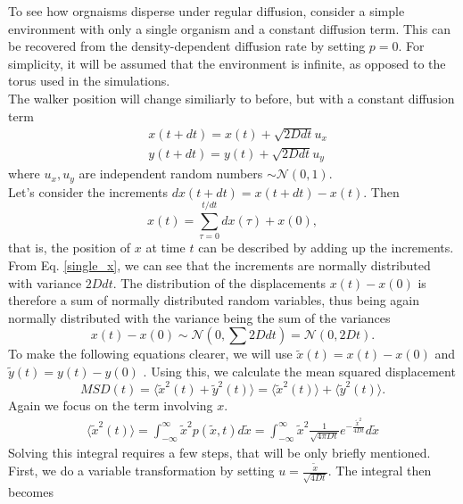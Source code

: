 \documentclass{article}
\begin{document}
To see how orgnaisms disperse under regular diffusion, consider a simple environment with only a single organism and a constant diffusion term. 
This can be recovered from the density-dependent diffusion rate by setting $p=0$.
For simplicity, it will be assumed that the environment is infinite, as opposed to the torus used in the simulations.\\
The walker position will change similiarly to before, but with a constant diffusion term
\begin{align}
    & x(t + dt) = x(t) + \sqrt{2D dt} u_x \label{single_x}\\
    & y(t + dt) = y(t) + \sqrt{2D dt} u_y
\end{align}
where $u_x, u_y$ are independent random numbers $\sim \mathcal{N}(0,1)$.\\
Let's consider the increments $dx(t+dt) = x(t + dt) - x(t)$.
Then 
\begin{equation*}
    x(t) = \sum_{\tau = 0}^{t/dt} dx(\tau) + x(0),
\end{equation*}
that is, the position of $x$ at time $t$ can be described by adding up the increments.
From Eq. \ref{single_x}, we can see that the increments are normally distributed with variance $2D dt$.
The distribution of the displacements $x(t) - x(0)$ is therefore a sum of normally distributed random variables, thus being again normally distributed with the variance being the sum of the variances 
\begin{equation*}
    x(t) - x(0) \sim \mathcal{N}(0,\sum 2D dt) =  \mathcal{N}(0,2Dt).
\end{equation*}
To make the following equations clearer, we will use $\tilde{x}(t) = x(t)-x(0)$ and $\tilde{y}(t) = y(t)-y(0)$ .
Using this, we calculate the mean squared displacement 
\begin{equation*}
    MSD(t) = \langle \tilde{x}^2(t) +\tilde{y}^2(t) \rangle = \langle \tilde{x}^2(t)\rangle + \langle\tilde{y}^2(t) \rangle.
\end{equation*}
Again we focus on the term involving $x$.
\begin{align*}
    \langle \tilde{x}^2(t)\rangle = \int_{-\infty}^{\infty} \tilde{x}^2 p(\tilde{x},t)d\tilde{x} = \int_{-\infty}^{\infty} \tilde{x}^2 \frac{1}{\sqrt{4\pi Dt}} e^{-\frac{\tilde{x}^2}{4Dt}}d\tilde{x}
\end{align*}
Solving this integral requires a few steps, that will be only briefly mentioned. 
First, we do a variable transformation by setting $u = \frac{\tilde{x}}{\sqrt{4Dt}}$. 
The integral then becomes
\end{document}
